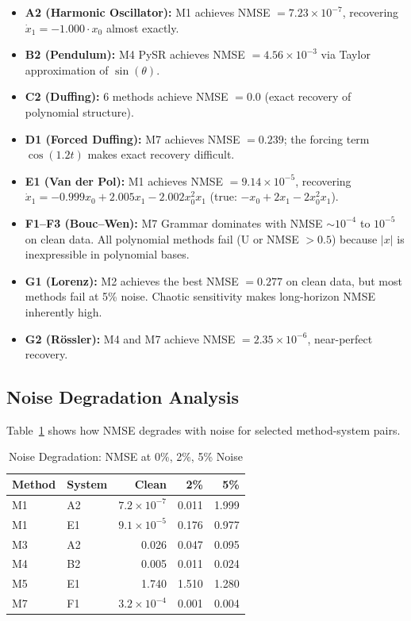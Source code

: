 \documentclass[conference]{IEEEtran}
\begin{document}
\begin{itemize}
    \item \textbf{A2 (Harmonic Oscillator):} M1 achieves NMSE $= 7.23 \times 10^{-7}$, recovering $\dot{x}_1 = -1.000 \cdot x_0$ almost exactly.
    \item \textbf{B2 (Pendulum):} M4 PySR achieves NMSE $= 4.56 \times 10^{-3}$ via Taylor approximation of $\sin(\theta)$.
    \item \textbf{C2 (Duffing):} 6 methods achieve NMSE $= 0.0$ (exact recovery of polynomial structure).
    \item \textbf{D1 (Forced Duffing):} M7 achieves NMSE $= 0.239$; the forcing term $\cos(1.2t)$ makes exact recovery difficult.
    \item \textbf{E1 (Van der Pol):} M1 achieves NMSE $= 9.14 \times 10^{-5}$, recovering $\dot{x}_1 = -0.999 x_0 + 2.005 x_1 - 2.002 x_0^2 x_1$ (true: $-x_0 + 2x_1 - 2x_0^2 x_1$).
    \item \textbf{F1--F3 (Bouc--Wen):} M7 Grammar dominates with NMSE $\sim 10^{-4}$ to $10^{-5}$ on clean data. All polynomial methods fail (U or NMSE $> 0.5$) because $|x|$ is inexpressible in polynomial bases.
    \item \textbf{G1 (Lorenz):} M2 achieves the best NMSE $= 0.277$ on clean data, but most methods fail at 5\% noise. Chaotic sensitivity makes long-horizon NMSE inherently high.
    \item \textbf{G2 (R\"{o}ssler):} M4 and M7 achieve NMSE $= 2.35 \times 10^{-6}$, near-perfect recovery.
\end{itemize}

\subsection{Noise Degradation Analysis}

Table~\ref{tab:noise_degradation} shows how NMSE degrades with noise for selected method-system pairs.

\begin{table}[!ht]
\centering
\caption{Noise Degradation: NMSE at 0\%, 2\%, 5\% Noise}
\label{tab:noise_degradation}
\begin{tabular}{@{}llrrr@{}}
\toprule
\textbf{Method} & \textbf{System} & \textbf{Clean} & \textbf{2\%} & \textbf{5\%} \\
\midrule
M1 & A2 & $7.2\times10^{-7}$ & 0.011 & 1.999 \\
M1 & E1 & $9.1\times10^{-5}$ & 0.176 & 0.977 \\
M3 & A2 & 0.026 & 0.047 & 0.095 \\
M4 & B2 & 0.005 & 0.011 & 0.024 \\
M5 & E1 & 1.740 & 1.510 & 1.280 \\
M7 & F1 & $3.2\times10^{-4}$ & 0.001 & 0.004 \\
\bottomrule
\end{tabular}
\end{table}
\end{document}
